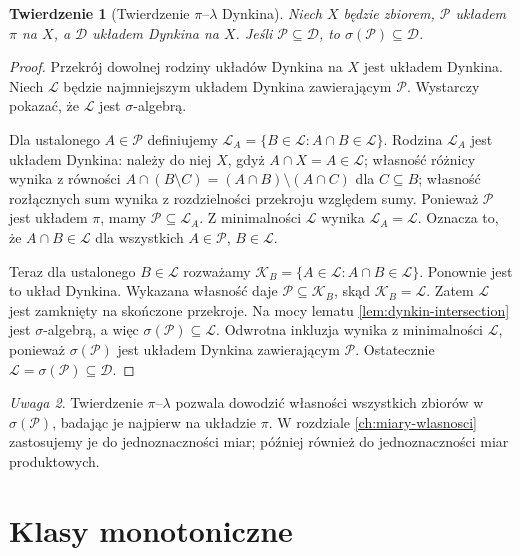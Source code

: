 \documentclass[11pt,a4paper,oneside]{book}
\numberwithin{equation}{chapter}
\theoremstyle{plain}
\newtheorem{twierdzenie}{Twierdzenie}[chapter]
\theoremstyle{definition}
\theoremstyle{remark}
\newtheorem{uwaga}[twierdzenie]{Uwaga}
\begin{document}
\begin{twierdzenie}[Twierdzenie $\pi$--$\lambda$ Dynkina]
\label{thm:pi-lambda}
Niech $X$ będzie zbiorem, $\mathcal P$ układem $\pi$ na $X$,
a $\mathcal D$ układem Dynkina na $X$. Jeśli
$\mathcal P\subseteq\mathcal D$, to
$\sigma(\mathcal P)\subseteq\mathcal D$.
\end{twierdzenie}
\begin{proof}
Przekrój dowolnej rodziny układów Dynkina na $X$ jest układem Dynkina.
Niech $\mathcal L$ będzie najmniejszym układem Dynkina zawierającym
$\mathcal P$. Wystarczy pokazać, że $\mathcal L$ jest $\sigma$-algebrą.

Dla ustalonego $A\in\mathcal P$ definiujemy
$\mathcal L_A=\{B\in\mathcal L:A\cap B\in\mathcal L\}$.
Rodzina $\mathcal L_A$ jest układem Dynkina: należy do niej $X$, gdyż
$A\cap X=A\in\mathcal L$; własność różnicy wynika z równości
$A\cap(B\setminus C)=(A\cap B)\setminus(A\cap C)$ dla $C\subseteq B$;
własność rozłącznych sum wynika z rozdzielności przekroju względem sumy.
Ponieważ $\mathcal P$ jest układem $\pi$, mamy
$\mathcal P\subseteq\mathcal L_A$. Z minimalności $\mathcal L$ wynika
$\mathcal L_A=\mathcal L$. Oznacza to, że
$A\cap B\in\mathcal L$ dla wszystkich $A\in\mathcal P$, $B\in\mathcal L$.

Teraz dla ustalonego $B\in\mathcal L$ rozważamy
$\mathcal K_B=\{A\in\mathcal L:A\cap B\in\mathcal L\}$.
Ponownie jest to układ Dynkina. Wykazana własność daje
$\mathcal P\subseteq\mathcal K_B$, skąd
$\mathcal K_B=\mathcal L$. Zatem $\mathcal L$ jest zamknięty
na skończone przekroje. Na mocy lematu \ref{lem:dynkin-intersection}
jest $\sigma$-algebrą, a więc $\sigma(\mathcal P)\subseteq\mathcal L$.
Odwrotna inkluzja wynika z minimalności $\mathcal L$, ponieważ
$\sigma(\mathcal P)$ jest układem Dynkina zawierającym $\mathcal P$.
Ostatecznie $\mathcal L=\sigma(\mathcal P)\subseteq\mathcal D$.
\end{proof}

\begin{uwaga}
Twierdzenie $\pi$--$\lambda$ pozwala dowodzić własności wszystkich
zbiorów w $\sigma(\mathcal P)$, badając je najpierw na układzie
$\pi$. W rozdziale \ref{ch:miary-wlasnosci} zastosujemy je do
jednoznaczności miar; później również do jednoznaczności miar produktowych.
\end{uwaga}

\section{Klasy monotoniczne}
\end{document}
